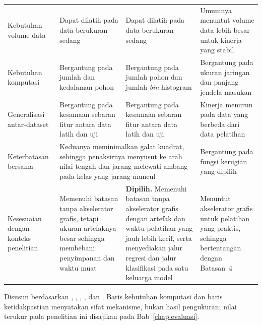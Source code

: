 \begin{longtable}{@{}p{2.2cm}p{3.5cm}p{3.45cm}p{3.45cm}@{}}
Kebutuhan volume data & Dapat dilatih pada data berukuran sedang & Dapat dilatih pada data berukuran sedang & Umumnya menuntut volume data lebih besar untuk kinerja yang stabil \\[2pt]

Kebutuhan komputasi & Bergantung pada jumlah dan kedalaman pohon & Bergantung pada jumlah pohon dan jumlah \emph{bin} histogram & Bergantung pada ukuran jaringan dan panjang jendela masukan \\[2pt]

Generalisasi antar-dataset & Bergantung pada kesamaan sebaran fitur antara data latih dan uji & Bergantung pada kesamaan sebaran fitur antara data latih dan uji & Kinerja menurun pada data yang berbeda dari data pelatihan \\[2pt]

Keterbatasan bersama & \multicolumn{2}{p{7.35cm}}{Keduanya meminimalkan galat kuadrat, sehingga penaksirnya menyusut ke arah nilai tengah dan jarang melewati ambang pada kelas yang jarang muncul} & Bergantung pada fungsi kerugian yang dipilih \\[2pt]

Kesesuaian dengan konteks penelitian & Memenuhi batasan tanpa akselerator grafis, tetapi ukuran artefaknya besar sehingga membebani penyimpanan dan waktu muat & \textbf{Dipilih.} Memenuhi batasan tanpa akselerator grafis dengan artefak dan waktu pelatihan yang jauh lebih kecil, serta menyediakan jalur regresi dan jalur klasifikasi pada satu keluarga model & Menuntut akselerator grafis untuk pelatihan yang praktis, sehingga bertentangan dengan Batasan~4 \\

\end{longtable}

\noindent\footnotesize Disusun berdasarkan \textcite{breiman2001}, \textcite{friedman2001}, \textcite{ke2017}, \textcite{hochreiter1997}, dan \textcite{ghimire2024}. Baris kebutuhan komputasi dan baris ketidakpastian menyatakan sifat mekanisme, bukan hasil pengukuran; nilai terukur pada penelitian ini disajikan pada Bab~\ref{chap:evaluasi}.\normalsize
